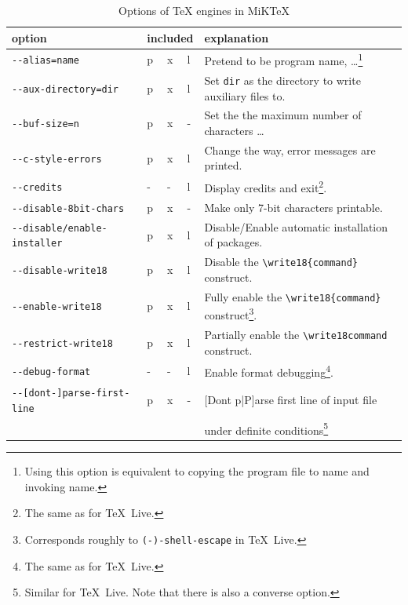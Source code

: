 \documentclass[a4paper]{article}%
\newcommand{\texlive}{\TeX~Live}
\newcommand{\miktex}{MiKTeX}
\begin{document}
{\footnotesize
\begin{longtable}{lllll}
  \toprule
  option & \multicolumn{3}{l}{included} & explanation \\
  \midrule
  \midrule
  \endfirsthead%
  \bottomrule
  \caption{\label{tab:latexOptionsCommonMiktex} Options of \TeX{} engines in \miktex}
  \endlastfoot%
  \texttt{-{}-alias=name}             & p&x&l       & Pretend to be program name, \dots\footnote%
 {Using this option is equivalent to copying the program file to name and invoking name.} \\
\texttt{-{}-aux-directory=dir}        & p&x&l       & 
Set \texttt{dir} as the directory to write auxiliary files to. \\
\texttt{-{}-buf-size=n}               & p&x&- & Set the the maximum number of characters \dots \\
\texttt{-{}-c-style-errors}           & p&x&l       & Change the way, error messages are printed. \\
\texttt{-{}-credits}                  & -&-&l & Display credits and exit\footnote%
   {The same as for \texlive. }. \\
\texttt{-{}-disable-8bit-chars}       & p&x&- & Make only 7-bit characters printable. \\
\texttt{-{}-disable/enable-installer} & p&x&l       & Disable/Enable automatic installation of packages. \\
\texttt{-{}-disable-write18}          & p&x&l       & Disable the \texttt{\textbackslash{}write18\{command\}} construct.\\
\texttt{-{}-enable-write18}           & p&x&l       & Fully enable the \texttt{\textbackslash{}write18\{command\}} construct\footnote%
{Corresponds roughly to \texttt{(-)-shell-escape} in \texlive. }. \\
\texttt{-{}-restrict-write18}         & p&x&l       & Partially enable the \texttt{\textbackslash{}write18{command}} construct. \\
\texttt{-{}-debug-format}             & -&-&l & Enable format debugging\footnote%
{The same as for \texlive. }. \\
\texttt{-{}-[dont-]parse-first-line}  & p&x&- & [Dont p|P]arse first line of input file \\
                                      &  & &        & under definite conditions\footnote%
{Similar for \texlive. Note that there is also a converse option. } \\

\end{longtable}}
\end{document}
